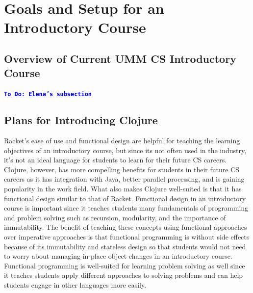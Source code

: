 \documentclass[12pt]{article}
\newcommand{\comment}[1]{{\bf \tt  {#1}}}
\newcommand{\emcomment}[1]{\textcolor{ForestGreen}{\comment{Elena: {#1}}}}
\newcommand{\todo}[1]{\textcolor{blue}{\comment{To Do: {#1}}}}
\newcommand{\pscomment}[1]{\textcolor{red}{\comment{Paul: {#1}}}}
\begin{document}
\section{Goals and Setup for an Introductory Course}\label{sec:racket-clojure}


\subsection{Overview of Current UMM CS Introductory Course}\label{subsec:course}
\todo{Elena's subsection}
~\cite{htdp}

\subsection{Plans for Introducing Clojure}\label{subsec:plans}
Racket's ease of use and functional design are helpful for teaching the learning objectives of an introductory course, but since its not often used in the industry, it's not an ideal language for students to learn for their future CS careers. Clojure, however, has more compelling benefits for students in their future CS careers as it has integration with Java, better parallel processing, and is gaining popularity in the work field. What also makes Clojure well-suited is that it has functional design similar to that of Racket. Functional design in an introductory course is important since it teaches students many fundamentals of programming and problem solving such as recursion, modularity, and the importance of immutability. The benefit of teaching these concepts using functional approaches over imperative approaches is that functional programming is without side effects because of its immutability and stateless design so that students would not need to worry about managing in-place object changes in an introductory course. Functional programming is well-suited for learning problem solving as well since it teaches students apply different approaches to solving problems and can help students engage in other languages more easily.
\end{document}
